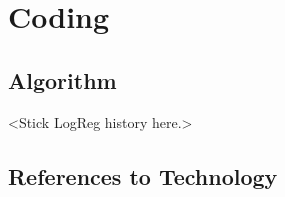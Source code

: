 \chapter{Coding}


\section{Algorithm}
<Stick LogReg history here.>

\section{References to Technology}

\begin{comment}
\paragraph{Machine Learning}
Machine learning is a subfield of computer science that evolved from the study of pattern recognition and computational learning theory in artificial intelligence.In 1959, Arthur Samuel defined machine learning as a 
\begin{quote}
"Field of study that gives computers the ability to learn without being explicitly programmed".
\end{quote} Machine learning explores the study and construction of algorithms that can learn from and make predictions on data. Such algorithms operate by building a model from example inputs in order to make data-driven predictions or decisions, rather than following strictly static program instructions.
\end{comment}

